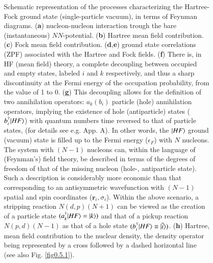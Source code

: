 \begin{figure}[h!]
	\caption{Schematic representation of the processes characterizing the Hartree-Fock ground state (single-particle vacuum), in terms of Feynman diagrams. (\textbf{a}) nucleon-nucleon interaction trough the bare (instantaneous) $NN$-potential. (\textbf{b}) Hartree mean field contribution. (\textbf{c}) Fock mean field contribution. (\textbf{d},\textbf{e}) ground state correlations (ZPF) associated with the Hartree and Fock fields. (\textbf{f}) There is, in HF (mean field) theory, a complete decoupling between occupied and empty states, labeled $i$ and $k$ respectively, and thus a sharp discontinuity at the Fermi energy of the occupation probability, from the value of 1 to 0. (\textbf{g}) This decoupling allows for the definition of two annihilation operators: $a_k(b_i)$ particle (hole) annihilation operators,   implying the existence of hole (antiparticle) states ($b^\dagger_i|{HF} \rangle$) with quantum numbers time reversed to that of particle states, (for details see e.g. \cite{Brink:05} App. A). In other words, the $|{HF} \rangle$ ground (vacuum) state is filled up to the Fermi energy ($\epsilon_F$) with $N$ nucleons. The system with $(N-1)$ nucleons can, within the language of (Feynman's) field theory, be described in terms of the degrees of freedom of that of the missing nucleon (hole-, antiparticle state). Such a description is  considerably more economic than that corresponding to an antisymmetric wavefunction with $(N-1)$ spatial and spin coordinates ($\mathbf r_i,\sigma_i$). Within the above scenario, a stripping reaction $N(d,p)(N+1)$ can be viewed as the creation of a particle state $(a^\dagger_k|{HF} \rangle=|{k} \rangle)$ and that of a pickup reaction $N(p,d)(N-1)$ as that of a hole state $(b^\dagger_i|{HF} \rangle\equiv|{\tilde i} \rangle)$. (\textbf{h}) Hartree, mean field contribution to the  nuclear density, the density operator being represented by a cross followed by a dashed horizontal line (see also Fig. \ref{fig0.5.1}).}
	\label{fig1.0.6}
\end{figure}
